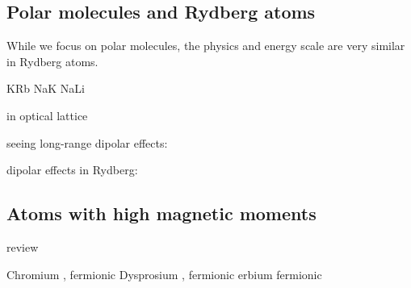
\subsection{Polar molecules and Rydberg atoms}
While we focus on polar molecules, the physics and energy scale are very similar
in Rydberg atoms.

KRb \cite{Ni2008b,Ospelkaus2010}
NaK \cite{Wu2012a}
NaLi \cite{Heo2012}

in optical lattice \cite{Chotia2012}

seeing long-range dipolar effects:
\cite{Yan2013}

dipolar effects in Rydberg: \cite{Westermann2006,Nipper2012b}


\subsection{Atoms with high magnetic moments}
review \cite{Lahaye2009}

Chromium \cite{Griesmaier2005a,Beaufils2008}, fermionic \cite{Naylor2015}
Dysprosium \cite{Lu2011}, fermionic \cite{Lu2012}
erbium \cite{Aikawa2012} fermionic \cite{Aikawa2014}



